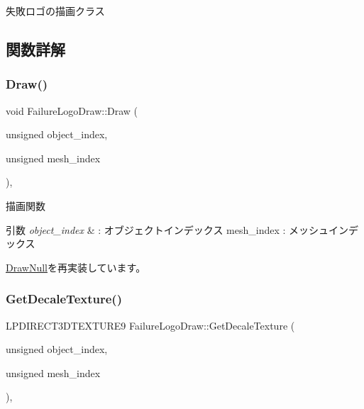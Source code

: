 失敗ロゴの描画クラス 

\subsection{関数詳解}
\mbox{\label{class_failure_logo_draw_a8ee20e1697bbbaf7f41c18334830488a}} 
\subsubsection{\texorpdfstring{Draw()}{Draw()}}
{\footnotesize\ttfamily void Failure\+Logo\+Draw\+::\+Draw (\begin{DoxyParamCaption}\item[{unsigned}]{object\+\_\+index,  }\item[{unsigned}]{mesh\+\_\+index }\end{DoxyParamCaption})\hspace{0.3cm}{\ttfamily [override]}, {\ttfamily [virtual]}}



描画関数 


\begin{DoxyParams}{引数}
{\em object\+\_\+index} & \+: オブジェクトインデックス mesh\+\_\+index \+: メッシュインデックス \\
\hline
\end{DoxyParams}


\mbox{\hyperlink{class_draw_null_afe50f6fd820b18d673f70f048743f339}{Draw\+Null}}を再実装しています。

\mbox{\label{class_failure_logo_draw_a2a74fafba17b2f63b1c61abd67289afd}} 
\subsubsection{\texorpdfstring{Get\+Decale\+Texture()}{GetDecaleTexture()}}
{\footnotesize\ttfamily L\+P\+D\+I\+R\+E\+C\+T3\+D\+T\+E\+X\+T\+U\+R\+E9 Failure\+Logo\+Draw\+::\+Get\+Decale\+Texture (\begin{DoxyParamCaption}\item[{unsigned}]{object\+\_\+index,  }\item[{unsigned}]{mesh\+\_\+index }\end{DoxyParamCaption})\hspace{0.3cm}{\ttfamily [override]}, {\ttfamily [virtual]}}




